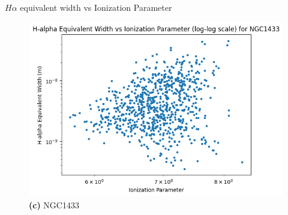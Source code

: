 \documentclass{beamer}
\begin{document}
\begin{frame}{$H\alpha$ equivalent width vs Ionization Parameter}
    \begin{figure}[H]
        \centering
        \includegraphics[scale = 0.25]{image31.png}
        \caption*{\textbf{(c)} NGC1433}
        \label{fig:image7}
    \end{figure}
\end{frame}
\end{document}
